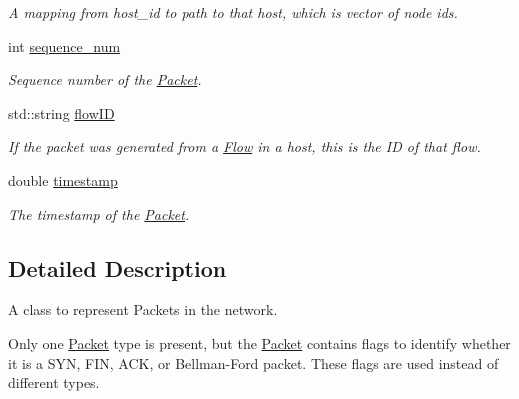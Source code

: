\begin{DoxyCompactItemize}
\begin{DoxyCompactList}\small\item\em \-A mapping from host\-\_\-id to path to that host, which is vector of node ids. \end{DoxyCompactList}\item 
int \hyperlink{classPacket_a1dcc152b6caa339c9d6f86c0fcde1c52}{sequence\-\_\-num}
\begin{DoxyCompactList}\small\item\em \-Sequence number of the \hyperlink{classPacket}{\-Packet}. \end{DoxyCompactList}\item 
\hypertarget{classPacket_ad841c025e14798586e5a01dfb17a8e56}{std\-::string \hyperlink{classPacket_ad841c025e14798586e5a01dfb17a8e56}{flow\-I\-D}}\label{classPacket_ad841c025e14798586e5a01dfb17a8e56}

\begin{DoxyCompactList}\small\item\em \-If the packet was generated from a \hyperlink{classFlow}{\-Flow} in a host, this is the \-I\-D of that flow. \end{DoxyCompactList}\item 
double \hyperlink{classPacket_a3c6b8af8bd18da132511da84aaba3acb}{timestamp}
\begin{DoxyCompactList}\small\item\em \-The timestamp of the \hyperlink{classPacket}{\-Packet}. \end{DoxyCompactList}\end{DoxyCompactItemize}


\subsection{\-Detailed \-Description}
\-A class to represent \-Packets in the network. 

\-Only one \hyperlink{classPacket}{\-Packet} type is present, but the \hyperlink{classPacket}{\-Packet} contains flags to identify whether it is a \-S\-Y\-N, \-F\-I\-N, \-A\-C\-K, or \-Bellman-\/\-Ford packet. \-These flags are used instead of different types. 

